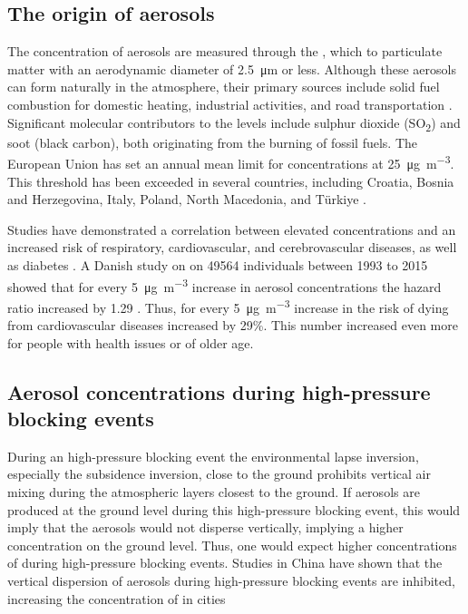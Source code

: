 \subsection{The origin of aerosols}
The concentration of aerosols are measured through the \PM, which to particulate matter with an aerodynamic diameter of \SI{2.5}{\micro\meter} or less. Although these aerosols can form naturally in the atmosphere, their primary sources include solid fuel combustion for domestic heating, industrial activities, and road transportation \cite{europeanenvironmentagencyEuropesAirQuality2024}. Significant molecular contributors to the \PM levels include sulphur dioxide (SO\textsubscript{2}) and soot (black carbon), both originating from the burning of fossil fuels. The European Union has set an annual mean limit for \PM  concentrations at \SI{25}{\micro\gram\per\cubic\meter}. This threshold has been exceeded in several countries, including Croatia, Bosnia and Herzegovina, Italy, Poland, North Macedonia, and Türkiye \cite{europeanenvironmentagencyEuropesAirQuality2024}. 

Studies have demonstrated a correlation between elevated \PM concentrations and an increased risk of respiratory, cardiovascular, and cerebrovascular diseases, as well as diabetes \cite{sharmaHealthEffectsAssociated2020}. A Danish study on on \SI{49564}{} individuals between 1993 to 2015 showed that for every \SI{5}{\micro\gram\per
\m\cubed} increase in aerosol concentrations the hazard ratio increased by 1.29 \cite{hvidtfeldtLongtermResidentialExposure2019}. Thus, for every \SI{5}{\micro\gram\per
\m\cubed} increase in \PM the risk of dying from cardiovascular diseases increased by 29\%. This number increased even more for people with health issues or of older age.  

\subsection{Aerosol concentrations during high-pressure blocking events}
During an high-pressure blocking event the environmental lapse inversion, especially the subsidence inversion, close to the ground prohibits vertical air mixing during the atmospheric layers closest to the ground. If aerosols are produced at the ground level during this high-pressure blocking event, this would imply that the aerosols would not disperse vertically, implying a higher concentration on the ground level. Thus, one would expect higher concentrations of \PM during high-pressure blocking events. Studies in China have shown that the vertical dispersion of aerosols during high-pressure blocking events are inhibited, increasing the concentration of \PM in cities \cite{caiImpactBlockingStructure2020}

